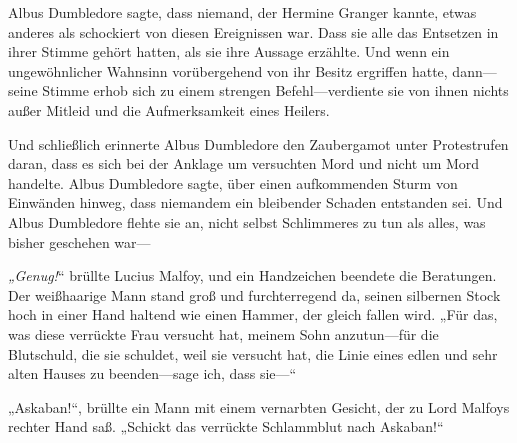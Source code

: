 Albus Dumbledore sagte, dass niemand, der Hermine Granger kannte, etwas anderes als schockiert von diesen Ereignissen war. Dass sie alle das Entsetzen in ihrer Stimme gehört hatten, als sie ihre Aussage erzählte. Und wenn ein ungewöhnlicher Wahnsinn vorübergehend von ihr Besitz ergriffen hatte, dann—seine Stimme erhob sich zu einem strengen Befehl—verdiente sie von ihnen nichts außer Mitleid und die Aufmerksamkeit eines Heilers.

Und schließlich erinnerte Albus Dumbledore den Zaubergamot unter Protestrufen daran, dass es sich bei der Anklage um versuchten Mord und nicht um Mord handelte. Albus Dumbledore sagte, über einen aufkommenden Sturm von Einwänden hinweg, dass niemandem ein bleibender Schaden entstanden sei. Und Albus Dumbledore flehte sie an, nicht selbst Schlimmeres zu tun als alles, was bisher geschehen war—

\emph{„Genug!}“ brüllte Lucius Malfoy, und ein Handzeichen beendete die Beratungen. Der weißhaarige Mann stand groß und furchterregend da, seinen silbernen Stock hoch in einer Hand haltend wie einen Hammer, der gleich fallen wird. „Für das, was diese verrückte Frau versucht hat, meinem Sohn anzutun—für die Blutschuld, die sie schuldet, weil sie versucht hat, die Linie eines edlen und sehr alten Hauses zu beenden—sage ich, dass sie—“

„Askaban!“, brüllte ein Mann mit einem vernarbten Gesicht, der zu Lord Malfoys rechter Hand saß. „Schickt das verrückte Schlammblut nach Askaban!“

